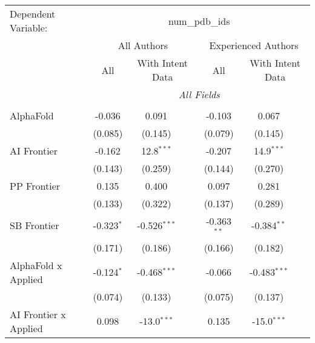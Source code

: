 \begingroup
\centering
\begin{tabular}{lcccccc}
   \tabularnewline \midrule \midrule
   Dependent Variable: & \multicolumn{6}{c}{num\_pdb\_ids}\\
 & \multicolumn{3}{c}{All Authors} & \multicolumn{3}{c}{Experienced Authors} \\
\cmidrule(lr){2-4} \cmidrule(lr){5-7}
 & \multicolumn{1}{c}{All} & \multicolumn{2}{c}{With Intent Data} & \multicolumn{1}{c}{All} & \multicolumn{2}{c}{With Intent Data} \\
\cmidrule(lr){2-2} \cmidrule(lr){3-4} \cmidrule(lr){5-5} \cmidrule(lr){6-7}
 & \multicolumn{6}{c}{\textit{All Fields}} \\ \\
   AlphaFold                      & -0.036         & 0.091          &               & -0.103         & 0.067          &   \\   
                                  & (0.085)        & (0.145)        &               & (0.079)        & (0.145)        &   \\   
   AI Frontier                    & -0.162         & 12.8$^{***}$   &               & -0.207         & 14.9$^{***}$   &   \\   
                                  & (0.143)        & (0.259)        &               & (0.144)        & (0.270)        &   \\   
   PP Frontier                    & 0.135          & 0.400          &               & 0.097          & 0.281          &   \\   
                                  & (0.133)        & (0.322)        &               & (0.137)        & (0.289)        &   \\   
   SB Frontier                    & -0.323$^{*}$   & -0.526$^{***}$ &               & -0.363$^{**}$  & -0.384$^{**}$  &   \\   
                                  & (0.171)        & (0.186)        &               & (0.166)        & (0.182)        &   \\   
   AlphaFold x Applied            & -0.124$^{*}$   & -0.468$^{***}$ &               & -0.066         & -0.483$^{***}$ &   \\   
                                  & (0.074)        & (0.133)        &               & (0.075)        & (0.137)        &   \\   
   AI Frontier x Applied          & 0.098          & -13.0$^{***}$  &               & 0.135          & -15.0$^{***}$  &   \\   

\end{tabular}
